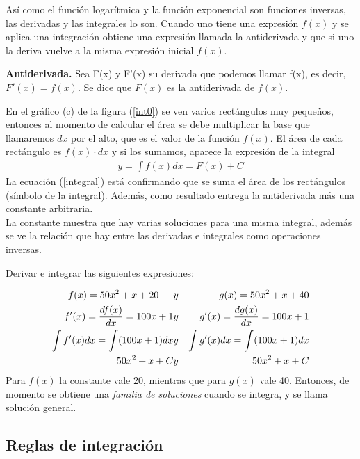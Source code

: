 Así como el función logarítmica y la función exponencial son funciones inversas, las derivadas y las integrales lo son. Cuando uno tiene una expresión $f(x)$ y se aplica una integración obtiene una expresión llamada la antiderivada y que si uno la deriva vuelve a la misma expresión inicial $f(x)$.


\newpage
\begin{mydef}
\textbf{Antiderivada. } Sea F(x) y F'(x) su derivada que podemos llamar f(x), es decir, $F'(x)=f(x)$. Se dice que $F(x)$ es la antiderivada de $f(x)$.
\end{mydef}

En el gráfico (c) de la figura (\ref{int0}) se ven varios rectángulos muy pequeños, entonces al momento de calcular el área se debe multiplicar la base que llamaremos $dx$ por el alto, que es el valor de la función $f(x)$. El área de cada rectángulo es $f(x)\cdot dx$ y si los sumamos, aparece la expresión de la integral 
\begin{eqnarray}
y=\int f(x)dx= F(x)+C
\label{integral}
\end{eqnarray}
La ecuación (\ref{integral}) está confirmando que se suma el área de los rectángulos (símbolo de la integral). Además, como resultado entrega la antiderivada más una constante arbitraria.\\
La constante muestra que hay varias soluciones para una misma integral, además se ve la relación que hay entre las derivadas e integrales como operaciones inversas.
\begin{myexample}
Derivar e integrar las siguientes expresiones:
\end{myexample}
\begin{eqnarray*}
f(x)=50x^{2}+x+20 \hspace{15px} &y& \hspace{15px} g(x)=50x^{2}+x+40\\
f'(x)=\dfrac{df(x)}{dx}=100x+1 &y& g'(x)=\dfrac{dg(x)}{dx}=100x+1\\
\int f'(x)dx =\int (100x+1)dx &y& \int g'(x)dx = \int (100x+1)dx \\
50x^{2}+x+C &y& 50x^{2}+x+C
\label{constC}
\end{eqnarray*}
Para $f(x)$ la constante vale 20, mientras que para $g(x)$ vale 40. Entonces, de momento se obtiene una \textit{familia de soluciones} cuando se integra, y se llama solución general. 
\subsection{Reglas de integración}

